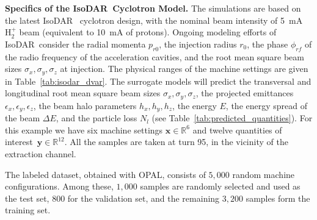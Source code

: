 \documentclass[a4paper, 12pt, version-1-compatibility]{article}
\def\isodar{IsoDAR}
\def\opal{OPAL}
\def\qois{quantities of interest}
\newcommand{\tabref}[1]{Table~\ref{#1}}
\newcommand{\myvec}[1]{\mathbf{#1}}
\newcommand{\DD}{DAE$\delta$ALUS\xspace}
\newcommand{\htp}{\ensuremath{\mathrm{H}_2^+}\xspace}
\begin{document}
{\bf Specifics of the \isodar\ Cyclotron Model.}
The simulations are based on the latest \isodar\ \cite{alonso, Bungau, doi:10.1063/1.5127681} 
cyclotron design, with the nominal 
beam intensity of \SI{5}{mA} \htp beam (equivalent to \SI{10}{mA} of protons). Ongoing modeling efforts of \isodar\ consider the radial momenta $p_{r0}$, the injection radius $r_0$, the phase $\phi_{rf}$ of the radio frequency of the acceleration cavities, and the root mean square beam sizes $\sigma_{x}, \sigma_{y}, \sigma_{z}$ at injection. The physical ranges of the machine settings are given in \tabref{tab:isodar_dvar}. The surrogate models will predict the transversal and longitudinal root mean square beam sizes $\sigma_x, \sigma_y, \sigma_z$, the projected emittances $\epsilon_x, \epsilon_y, \epsilon_z$, the beam halo parameters $h_x, h_y, h_z$, the energy $E$, the energy spread of the beam $\Delta E$, and the particle loss $N_l$ (see \tabref{tab:predicted_quantities}). For this example we have six machine settings $\myvec{x} \in \mathbb{R}^6$ and twelve \qois\ $\myvec{y} \in \mathbb{R}^{12}$. All the samples are taken at turn 95, in the vicinity of the extraction channel. 

The labeled dataset, obtained with \opal,  consists of $5,000$ random machine configurations. Among these, $1,000$ samples are randomly selected and used as the test set, $800$ for the validation set, and the remaining $3,200$ samples form the training set. 
\end{document}
